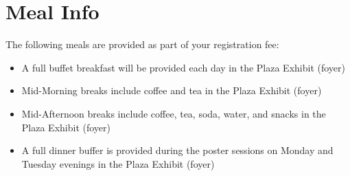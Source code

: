 \setheaders{}{}
\section{Meal Info}{}

The following meals are provided as part of your registration fee:

\begin{itemize}
\item A full buffet breakfast will be provided each day in the Plaza
  Exhibit (foyer)
\item Mid-Morning breaks include coffee and tea in the Plaza Exhibit
  (foyer)
\item Mid-Afternoon breaks include coffee, tea, soda, water, and
  snacks in the Plaza Exhibit (foyer)
\item A full dinner buffer is provided during the poster sessions on
  Monday and Tuesday evenings in the Plaza Exhibit (foyer)
\end{itemize}
